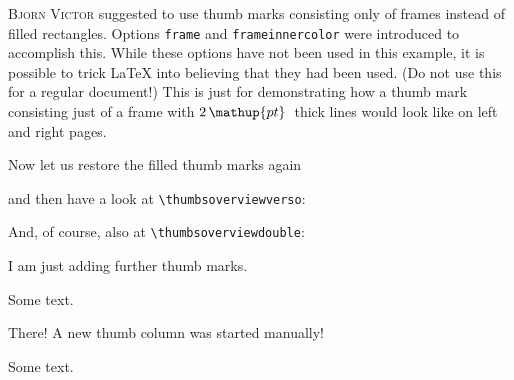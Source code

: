 \documentclass[a4paper,twoside,british]{article}[2025/01/22]%
\DeclareRobustCommand{\unit}[1]{\ensuremath{\mathord{\thinspace\mathup{#1}}}}
\begin{document}
\newpage

\makeatletter%
\ifx\thumbs@frame\thumbs@empty\relax%
  \gdef\thumbs@frame{2pt}%
  \gdef\th@mbs@fr@meinnercolor{\thepagecolor}%
  \gdef\thumbs@checkforexample{0}%
\else%
  \gdef\thumbs@checkforexample{1}%
\fi%
\makeatother%

\textsc{Bjorn Victor} suggested to use thumb marks consisting only of frames
instead of filled rectangles. Options \texttt{frame} and \texttt{frameinnercolor} were introduced
to accomplish this. While these options have not been used in this example, it is possible to trick
\LaTeX{} into believing that they had been used. (Do not use this for a regular document!)
This is just for demonstrating how a thumb mark consisting just of a frame with
$2\unit{pt}$~thick lines would look like\newpage
\noindent on left and right pages.\newpage

Now let us restore the filled thumb marks again

\makeatletter%
\ifx\thumbs@checkforexample\thumbs@zero\relax%
  \gdef\thumbs@frame{\empty}%
  \gdef\th@mbs@fr@meinnercolor{\thepagecolor}%
\fi%
\makeatother%

and then have a look at \verb|\thumbsoverviewverso|:

%

\newpage

And, of course, also at \verb|\thumbsoverviewdouble|:

%

\newpage


I am just adding further thumb marks.
\newpage


Some text.

\newpage
\thumbnewcolumn
{}

There! A new thumb column was started manually!

\newpage
Some text.
\newpage
\end{document}

